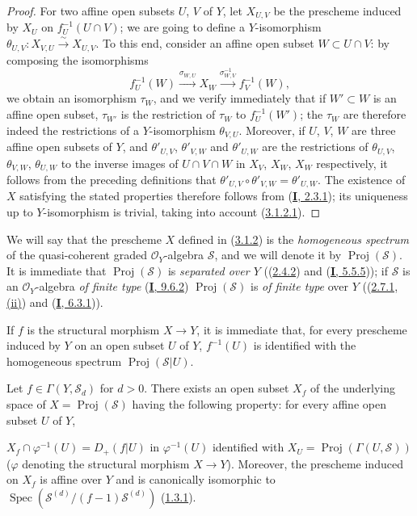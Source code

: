 \begin{proof}
For two affine open subsets $U$, $V$ of $Y$, let $X_{U,V}$ be the prescheme
induced by $X_U$ on $f_U^{-1}(U\cap V)$; we are going to define a
$Y$-isomorphism $\theta_{U,V}:X_{V,U}\xrightarrow{\sim}X_{U,V}$. To this end,
consider an affine open subset $W\subset U\cap V$: by composing the
isomorphisms
\[
  f_U^{-1}(W)\xrightarrow{\sigma_{W,U}}X_W
  \xrightarrow{\sigma_{W,V}^{-1}}f_V^{-1}(W),
\]
we obtain an isomorphism $\tau_W$, and we verify immediately that if
$W'\subset W$ is an affine open subset, $\tau_{W'}$ is the restriction of
$\tau_W$ to $f_U^{-1}(W')$; the $\tau_W$ are therefore indeed the
restrictions of a $Y$-isomorphism $\theta_{V,U}$. Moreover, if $U$, $V$, $W$
are three affine open subsets of $Y$, and $\theta'_{U,V}$, $\theta'_{V,W}$
and $\theta'_{U,W}$ are the restrictions of $\theta_{U,V}$, $\theta_{V,W}$,
$\theta_{U,W}$ to the inverse images of $U\cap V\cap W$ in $X_V$, $X_W$,
$X_W$ respectively, it follows from the preceding definitions that
$\theta'_{U,V}\circ\theta'_{V,W}=\theta'_{U,W}$. The existence of $X$
satisfying the stated properties therefore follows from
(\hyperref[I.2.3.1]{\textbf{I}, 2.3.1}); its uniqueness up to $Y$-isomorphism is
trivial, taking into account (\hyperref[II.3.1.2.1]{3.1.2.1}).
\end{proof}

\begin{env}[3.1.3]
\label{II.3.1.3}
We will say that the prescheme $X$ defined in
(\hyperref[II.3.1.2]{3.1.2}) is the \emph{homogeneous spectrum} of the
quasi-coherent graded $\mathcal{O}_Y$-algebra $\mathcal{S}$, and we will
denote it by $\operatorname{Proj}(\mathcal{S})$. It is immediate that
$\operatorname{Proj}(\mathcal{S})$ is \emph{separated over $Y$}
((\hyperref[II.2.4.2]{2.4.2}) and
(\hyperref[I.5.5.5]{\textbf{I}, 5.5.5})); if $\mathcal{S}$ is an
$\mathcal{O}_Y$-algebra \emph{of finite type}
(\hyperref[I.9.6.2]{\textbf{I}, 9.6.2}) $\operatorname{Proj}(\mathcal{S})$ is
\emph{of finite type} over $Y$ ((\hyperref[II.2.7.1]{2.7.1, (ii)}) and
(\hyperref[I.6.3.1]{\textbf{I}, 6.3.1})).

If $f$ is the structural morphism $X\to Y$, it is immediate that, for every
prescheme induced by $Y$ on an open subset $U$ of $Y$, $f^{-1}(U)$ is
identified with the homogeneous spectrum $\operatorname{Proj}(\mathcal{S}|U)$.
\end{env}

\begin{proposition}[3.1.4]
\label{II.3.1.4}
Let $f\in\Gamma(Y,\mathcal{S}_d)$ for $d>0$. There exists an open subset
$X_f$ of the underlying space of $X=\operatorname{Proj}(\mathcal{S})$ having
the following property: for every affine open subset $U$ of $Y$,


$X_f\cap\varphi^{-1}(U)=D_+(f|U)$ in $\varphi^{-1}(U)$ identified with
$X_U=\operatorname{Proj}(\Gamma(U,\mathcal{S}))$ ($\varphi$ denoting the
structural morphism $X\to Y$). Moreover, the prescheme induced on $X_f$ is
affine over $Y$ and is canonically isomorphic to
$\operatorname{Spec}(\mathcal{S}^{(d)}/(f-1)\mathcal{S}^{(d)})$
\textup{(\hyperref[II.1.3.1]{1.3.1})}.
\end{proposition}

